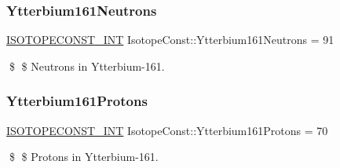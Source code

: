 \subsubsection{\texorpdfstring{Ytterbium161\+Neutrons}{Ytterbium161Neutrons}}
{\footnotesize\ttfamily \mbox{\hyperlink{group___isotope_const-_macros_ga5f18360b3e99483a35c32d789e62621c}{I\+S\+O\+T\+O\+P\+E\+C\+O\+N\+S\+T\+\_\+\+I\+NT}} Isotope\+Const\+::\+Ytterbium161\+Neutrons = 91}

\$ \$ Neutrons in Ytterbium-\/161. \mbox{\label{group___isotope_const-_ytterbium-_yb161_ga910b95015be71b78df84692694c9d897}} 
\subsubsection{\texorpdfstring{Ytterbium161\+Protons}{Ytterbium161Protons}}
{\footnotesize\ttfamily \mbox{\hyperlink{group___isotope_const-_macros_ga5f18360b3e99483a35c32d789e62621c}{I\+S\+O\+T\+O\+P\+E\+C\+O\+N\+S\+T\+\_\+\+I\+NT}} Isotope\+Const\+::\+Ytterbium161\+Protons = 70}

\$ \$ Protons in Ytterbium-\/161. 